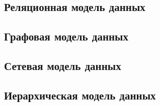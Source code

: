 
\subsection{Реляционная модель данных}

\subsection{Графовая модель данных}

\subsection{Сетевая модель данных}

\subsection{Иерархическая модель данных}